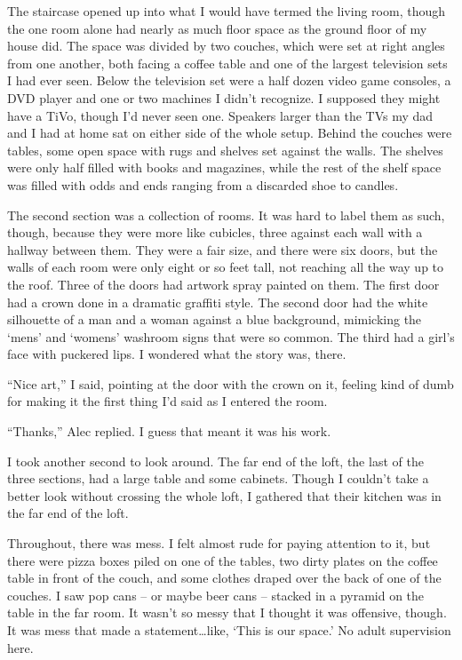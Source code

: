 The staircase opened up into what I would have termed the living room, though the one room alone had nearly as much floor space as the ground floor of my house did.  The space was divided by two couches, which were set at right angles from one another, both facing a coffee table and one of the largest television sets I had ever seen.  Below the television set were a half dozen video game consoles, a DVD player and one or two machines I didn't recognize.  I supposed they might have a TiVo, though I'd never seen one.  Speakers larger than the TVs my dad and I had at home sat on either side of the whole setup.  Behind the couches were tables, some open space with rugs and shelves set against the walls.  The shelves were only half filled with books and magazines, while the rest of the shelf space was filled with odds and ends ranging from a discarded shoe to candles.



The second section was a collection of rooms.  It was hard to label them as such, though, because they were more like cubicles, three against each wall with a hallway between them.  They were a fair size, and there were six doors, but the walls of each room were only eight or so feet tall, not reaching all the way up to the roof.  Three of the doors had artwork spray painted on them.  The first door had a crown done in a dramatic graffiti style.  The second door had the white silhouette of a man and a woman against a blue background, mimicking the `mens' and `womens' washroom signs that were so common.  The third had a girl's face with puckered lips.  I wondered what the story was, there.



``Nice art,'' I said, pointing at the door with the crown on it, feeling kind of dumb for making it the first thing I'd said as I entered the room.



``Thanks,'' Alec replied.  I guess that meant it was his work.



I took another second to look around.  The far end of the loft, the last of the three sections, had a large table and some cabinets.  Though I couldn't take a better look without crossing the whole loft, I gathered that their kitchen was in the far end of the loft.



Throughout, there was mess.  I felt almost rude for paying attention to it, but there were pizza boxes piled on one of the tables, two dirty plates on the coffee table in front of the couch, and some clothes draped over the back of one of the couches.  I saw pop cans – or maybe beer cans – stacked in a pyramid on the table in the far room.  It wasn't so messy that I thought it was offensive, though.  It was mess that made a statement\ldots like, `This is our space.'  No adult supervision here.



